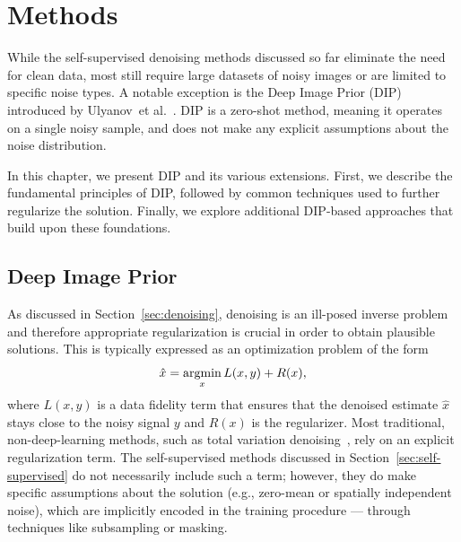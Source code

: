 \chapter{Methods}

While the self-supervised denoising methods discussed so far eliminate the need for clean data, most still require large datasets of noisy images or are limited to specific noise types.
A notable exception is the Deep Image Prior (DIP) introduced by Ulyanov~et al.~\cite{DIP}.
DIP is a zero-shot method, meaning it operates on a single noisy sample, and does not make any explicit assumptions about the noise distribution.

In this chapter, we present DIP and its various extensions.
First, we describe the fundamental principles of DIP, followed by common techniques used to further regularize the solution.
Finally, we explore additional DIP-based approaches that build upon these foundations.

\section{Deep Image Prior}

As discussed in Section~\ref{sec:denoising}, denoising is an ill-posed inverse problem and therefore appropriate regularization is crucial in order to obtain plausible solutions.
This is typically expressed as an optimization problem of the form
\begin{equation}\label{eq:ip-optim}
    \hat{x} = \operatorname*{argmin}_x L(x,y) + R(x),
\end{equation}
where $L(x,y)$ is a data fidelity term that ensures that the denoised estimate $\hat{x}$ stays close to the noisy signal $y$ and $R(x)$ is the regularizer.
Most traditional, non-deep-learning methods, such as total variation denoising~\cite{TV}, rely on an explicit regularization term.
The self-supervised methods discussed in Section~\ref{sec:self-supervised} do not necessarily include such a term; however, they do make specific assumptions about the solution (e.g., zero-mean or spatially independent noise), which are implicitly encoded in the training procedure --- through techniques like subsampling or masking.

